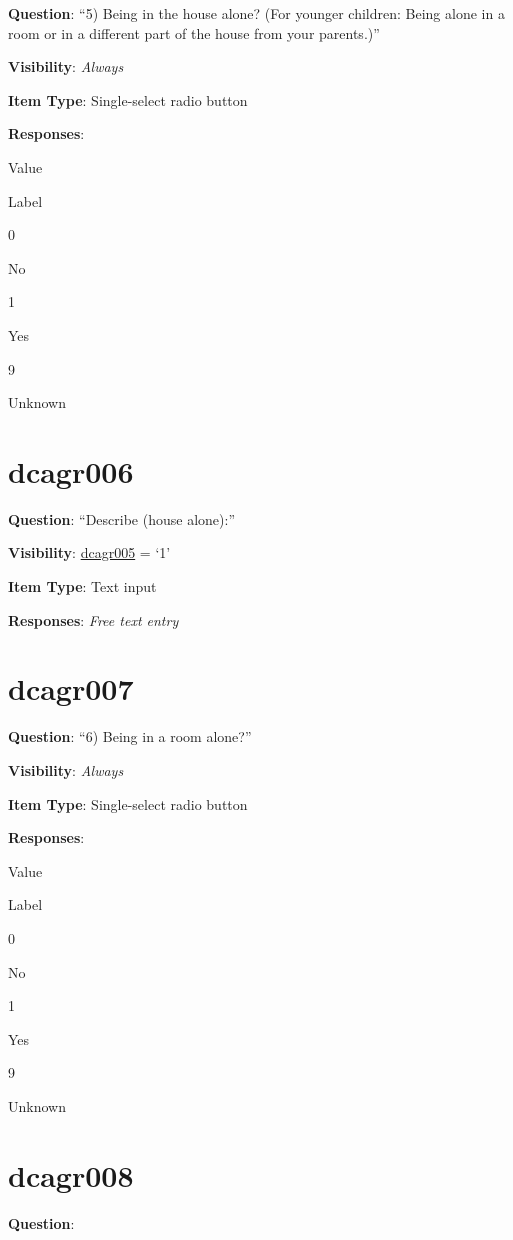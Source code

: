 \documentclass[]{book}
\begin{document}
\textbf{Question}: ``5) Being in the house alone? (For younger children: Being alone in a room or in a different part of the house from your parents.)''

\textbf{Visibility}: \emph{Always}

\textbf{Item Type}: Single-select radio button

\textbf{Responses}:

Value

Label

0

No

1

Yes

9

Unknown

\hypertarget{dcagr006}{%
\section{dcagr006}\label{dcagr006}}

\textbf{Question}: ``Describe (house alone):''

\textbf{Visibility}: \protect\hyperlink{dcagr005}{dcagr005} = `1'

\textbf{Item Type}: Text input

\textbf{Responses}: \emph{Free text entry}

\hypertarget{dcagr007}{%
\section{dcagr007}\label{dcagr007}}

\textbf{Question}: ``6) Being in a room alone?''

\textbf{Visibility}: \emph{Always}

\textbf{Item Type}: Single-select radio button

\textbf{Responses}:

Value

Label

0

No

1

Yes

9

Unknown

\hypertarget{dcagr008}{%
\section{dcagr008}\label{dcagr008}}

\textbf{Question}:
\end{document}
